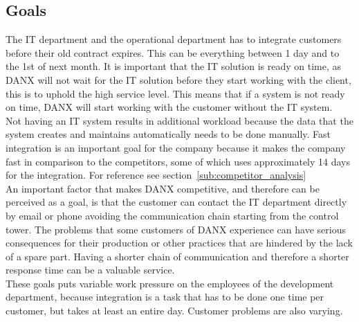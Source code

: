 \subsection{Goals}
The IT department and the operational department has to integrate customers before their old contract expires. This can be everything between 1 day and to the 1st of next month.\cite{gert013}\cite{lasse008} It is important that the IT solution is ready on time, as DANX will not wait for the IT solution before they start working with the client\cite{lasse008}, this is to uphold the high service level. This means that if a system is not ready on time, DANX will start working with the customer without the IT system.\\
Not having an IT system results in additional workload because the data that the system creates and maintains automatically needs to be done manually. Fast integration is an important goal for the company because it makes the company fast in comparison to the competitors, some of which uses approximately 14 days for the integration. For reference see section~\ref{sub:competitor_analysis}\\
An important factor that makes DANX competitive, and therefore can be perceived as a goal, is that the customer can contact the IT department directly by email or phone avoiding the communication chain starting from the control tower. The problems that some customers of DANX experience can have serious consequences for their production or other practices that are hindered by the lack of a spare part.\cite{gert018} Having a shorter chain of communication and therefore a shorter response time can be a valuable service.\cite{lasse012}\\
These goals puts variable work pressure on the employees of the development department, because integration is a task that has to be done one time per customer, but takes at least an entire day. Customer problems are also varying.

